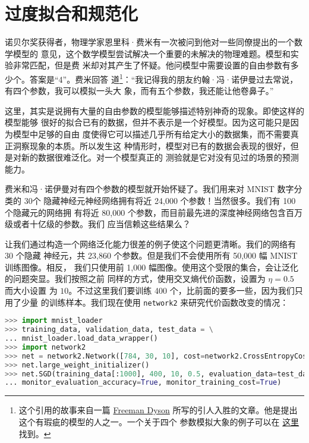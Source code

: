 \section{过度拟合和规范化}
\label{sec:overfitting_and_regularization}

诺贝尔奖获得者，物理学家恩里科·费米有一次被问到他对一些同僚提出的一个数学模型的
意见，这个数学模型尝试解决一个重要的未解决的物理难题。模型和实验非常匹配，但是费
米却对其产生了怀疑。他问模型中需要设置的自由参数有多少个。答案是``4''。费米回答
道\footnote{这个引用的故事来自一篇
  \href{http://www.nature.com/nature/journal/v427/n6972/full/427297a.html}{Freeman
    Dyson} 所写的引人入胜的文章。他是提出这个有瑕疵的模型的人之一。一个关于四个
  参数模拟大象的例子可以在%
  \href{http://www.johndcook.com/blog/2011/06/21/how-to-fit-an-elephant/}{这里}
  找到。}：``我记得我的朋友约翰·冯·诺伊曼过去常说，有四个参数，我可以模拟一头大
象，而有五个参数，我还能让他卷鼻子。''

这里，其实是说拥有大量的自由参数的模型能够描述特别神奇的现象。即使这样的模型能够
很好的拟合已有的数据，但并不表示是一个好模型。因为这可能只是因为模型中足够的自由
度使得它可以描述几乎所有给定大小的数据集，而不需要真正洞察现象的本质。所以发生这
种情形时，模型对已有的数据会表现的很好，但是对新的数据很难泛化。对一个模型真正的
测验就是它对没有见过的场景的预测能力。

费米和冯·诺伊曼对有四个参数的模型就开始怀疑了。我们用来对 MNIST 数字分类的 30个
隐藏神经元神经网络拥有将近 24,000 个参数！当然很多。我们有 100 个隐藏元的网络拥
有将近 80,000 个参数，而目前最先进的深度神经网络包含百万级或者十亿级的参数。我们
应当信赖这些结果么？

让我们通过构造一个网络泛化能力很差的例子使这个问题更清晰。我们的网络有 30 个隐藏
神经元，共 23,860 个参数。但是我们不会使用所有 50,000 幅 MNIST 训练图像。相反，
我们只使用前 1,000 幅图像。使用这个受限的集合，会让泛化的问题突显。我们按照之前
同样的方式，使用交叉熵代价函数，\learningrate{}设置为 $\eta = 0.5$ 而\minibatch{}大小设置
为 $10$。不过这里我们要训练 400 个\epochs{}，比前面的要多一些，因为我们只用了少量
的训练样本。我们现在使用 \lstinline!network2! 来研究代价函数改变的情况：

\begin{lstlisting}[language=Python]
>>> import mnist_loader
>>> training_data, validation_data, test_data = \
... mnist_loader.load_data_wrapper()
>>> import network2
>>> net = network2.Network([784, 30, 10], cost=network2.CrossEntropyCost)
>>> net.large_weight_initializer()
>>> net.SGD(training_data[:1000], 400, 10, 0.5, evaluation_data=test_data,
... monitor_evaluation_accuracy=True, monitor_training_cost=True)
\end{lstlisting}

